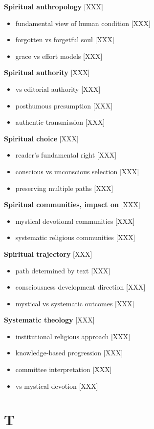 \documentclass[11pt,twoside]{book}
\begin{document}
\textbf{\textbf{Spiritual anthropology}} {[}XXX]
\begin{itemize}
\item fundamental view of human condition [XXX]
\item forgotten vs forgetful soul [XXX]
\item grace vs effort models [XXX]
\end{itemize}

\textbf{\textbf{Spiritual authority}} {[}XXX]
\begin{itemize}
\item vs editorial authority [XXX]
\item posthumous presumption [XXX]
\item authentic transmission [XXX]
\end{itemize}

\textbf{\textbf{Spiritual choice}} {[}XXX]
\begin{itemize}
\item reader's fundamental right [XXX]
\item conscious vs unconscious selection [XXX]
\item preserving multiple paths [XXX]
\end{itemize}

\textbf{\textbf{Spiritual communities, impact on}} {[}XXX]
\begin{itemize}
\item mystical devotional communities [XXX]
\item systematic religious communities [XXX]
\end{itemize}

\textbf{\textbf{Spiritual trajectory}} {[}XXX]
\begin{itemize}
\item path determined by text [XXX]
\item consciousness development direction [XXX]
\item mystical vs systematic outcomes [XXX]
\end{itemize}

\textbf{\textbf{Systematic theology}} {[}XXX]
\begin{itemize}
\item institutional religious approach [XXX]
\item knowledge-based progression [XXX]
\item committee interpretation [XXX]
\item vs mystical devotion [XXX]
\end{itemize}
\section*{T}
\label{sec:org3b8ec17}
\end{document}
